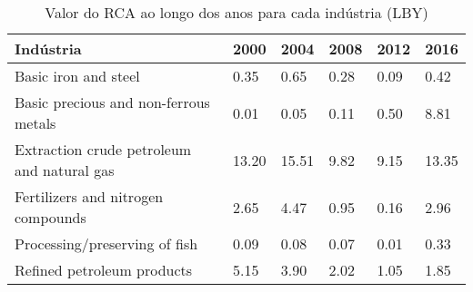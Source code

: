 \begin{table}
\centering
\caption{Valor do RCA ao longo dos anos para cada indústria (LBY)}
\begin{tabular}{p{6cm}p{1.5cm}p{1.5cm}p{1.5cm}p{1.5cm}p{1.5cm}}
\toprule
                                 Indústria &  2000 &  2004 & 2008 & 2012 &  2016 \\
\midrule
                      Basic iron and steel &  0.35 &  0.65 & 0.28 & 0.09 &  0.42 \\
     Basic precious and non-ferrous metals &  0.01 &  0.05 & 0.11 & 0.50 &  8.81 \\
Extraction crude petroleum and natural gas & 13.20 & 15.51 & 9.82 & 9.15 & 13.35 \\
        Fertilizers and nitrogen compounds &  2.65 &  4.47 & 0.95 & 0.16 &  2.96 \\
             Processing/preserving of fish &  0.09 &  0.08 & 0.07 & 0.01 &  0.33 \\
                Refined petroleum products &  5.15 &  3.90 & 2.02 & 1.05 &  1.85 \\
\bottomrule
\end{tabular}
\end{table}
